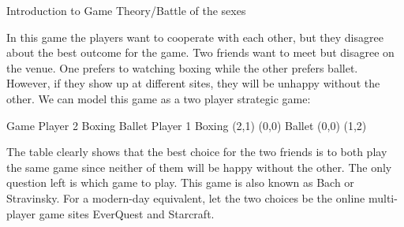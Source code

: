 Introduction to Game Theory/Battle of the sexes



In this game the players want to cooperate with each other, but they disagree about the best outcome for the game. 
Two friends want to meet but disagree on the venue. One prefers to watching boxing while the other prefers ballet. However, if they show up at different sites, they will be unhappy without the other. We can model this game as a two player strategic game: 

Game 
Player 2 
Boxing
Ballet 
Player 1 
Boxing 
(2,1)
(0,0) 
Ballet 
(0,0)
(1,2) 

The table clearly shows that the best choice for the two friends is to both play the same game since neither of them will be happy without the other. The only question left is which game to play. 
This game is also known as Bach or Stravinsky. For a modern-day equivalent, let the two choices be the online multi-player game sites EverQuest and Starcraft. 
